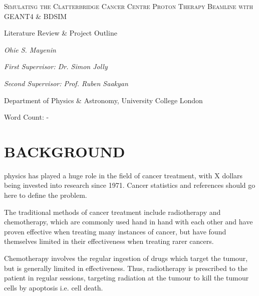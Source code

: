 \documentclass[a4paper, 12pt, conference]
{ieeeconf}      %
\begin{document}
\begin{titlepage}
	\centering
     
	{\scshape\Huge Simulating the Clatterbridge Cancer Centre Proton Therapy Beamline with GEANT4 \& BDSIM \par}
	\vspace{0.5cm}
	{\scshape\Large{Literature Review \& Project Outline\par}}
	\vspace{1cm}
	{\large\itshape Ohie S. Mayenin\par}
    \vspace{1cm}
    {\itshape First Supervisor: Dr. Simon Jolly\par}
    {\itshape Second Supervisor: Prof. Ruben Saakyan\par}
    \vspace{0.5cm}
    {Department of Physics \& Astronomy, University College London\par}
	\vspace{1cm}
    \vfill
	Word Count: -
	\vfill
\end{titlepage}





\section{BACKGROUND}

 physics has played a huge role in the field of cancer treatment, with X dollars being invested into research since 1971. Cancer statistics and references should go here to define the problem. 

The traditional methods of cancer treatment include radiotherapy and chemotherapy, which are commonly used hand in hand with each other and have proven effective when treating many instances of cancer, but have found themselves limited in their effectiveness when treating rarer cancers.

Chemotherapy involves the regular ingestion of drugs which target the tumour, but is generally limited in effectiveness. Thus, radiotherapy is prescribed to the patient in regular sessions, targeting radiation at the tumour to kill the tumour cells by apoptosis i.e. cell death. 
\end{document}
